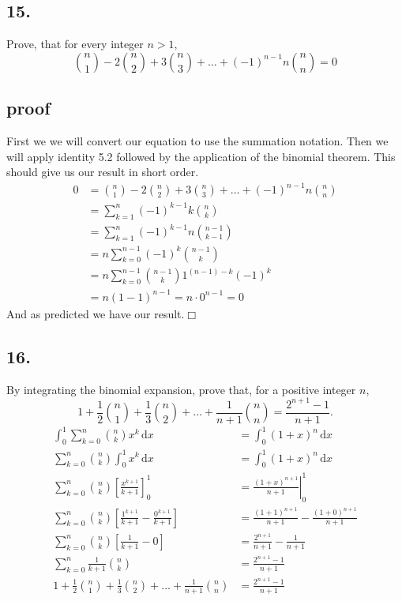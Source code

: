 \documentclass{article}
\begin{document}
\subsection*{15.}
Prove, that for every integer $n>1,$
\[\binom{n}{1}-2\binom{n}{2}+3\binom{n}{3}+\dots+(-1)^{n-1}n\binom{n}{n}=0\]
\subsection*{proof}
First we we will convert our equation to use the summation notation. Then we will apply identity 5.2 followed by the application of the binomial theorem. This should give us our result in short order.
\begin{align*}
  0&=\binom{n}{1}-2\binom{n}{2}+3\binom{n}{3}+\dots+(-1)^{n-1}n\binom{n}{n}\\
  &=\sum\limits_{k=1}^n{(-1)^{k-1}k\binom{n}{k}}\\
  &=\sum\limits_{k=1}^n{(-1)^{k-1}n\binom{n-1}{k-1}}\\
  &=n\sum\limits_{k=0}^{n-1}{(-1)^{k}\binom{n-1}{k}}\\
  &=n\sum\limits_{k=0}^{n-1}{\binom{n-1}{k}1^{(n-1)-k}(-1)^{k}}\\
  &=n(1-1)^{n-1}=n\cdot0^{n-1}=0
\end{align*}
And as predicted we have our result.$\Box$
\subsection*{16.}
By integrating the binomial expansion, prove that, for a positive integer $n$,
\[1+\frac{1}{2}\binom{n}{1}+\frac{1}{3}\binom{n}{2}+\dots+\frac{1}{n+1}\binom{n}{n}=\frac{2^{n+1}-1}{n+1}.\]
\begin{align*}
  \int_0^1{\sum\limits_{k=0}^n{\binom{n}{k}x^k}\,\mathrm{d}x}&=\int_0^1{(1+x)^n\,\mathrm{d}x}\\
  \sum\limits_{k=0}^n{\binom{n}{k}\int_0^1{x^k\,\mathrm{d}x}}&=\int_0^1{(1+x)^n\,\mathrm{d}x}\\
  \sum\limits_{k=0}^n{\binom{n}{k}\left[\frac{x^{k+1}}{k+1}\right]_0^1}&=\left.\frac{(1+x)^{n+1}}{n+1}\right\rvert_0^1\\
  \sum\limits_{k=0}^n{\binom{n}{k}\left[\frac{1^{k+1}}{k+1}-\frac{0^{k+1}}{k+1}\right]}&=\frac{(1+1)^{n+1}}{n+1}-\frac{(1+0)^{n+1}}{n+1}\\
  \sum\limits_{k=0}^n{\binom{n}{k}\left[\frac{1}{k+1}-0\right]}&=\frac{2^{n+1}}{n+1}-\frac{1}{n+1}\\
  \sum\limits_{k=0}^n{\frac{1}{k+1}\binom{n}{k}}&=\frac{2^{n+1}-1}{n+1}\\
  1+\frac{1}{2}\binom{n}{1}+\frac{1}{3}\binom{n}{2}+\dots+\frac{1}{n+1}\binom{n}{n}&=\frac{2^{n+1}-1}{n+1}
\end{align*}
\end{document}
